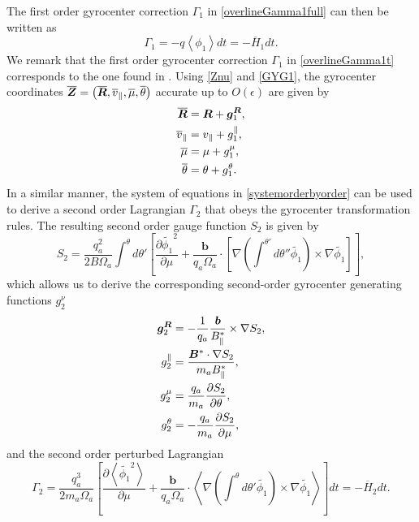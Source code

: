 %
The first order gyrocenter correction ${\Gamma}_1$ in \cref{overlineGamma1full} can then be written as
%
\begin{equation} \label{overlineGamma1t}
{\Gamma}_{1} = - q \left< \phi_1 \right> d t = - \overline H_1 dt.
\end{equation}
%
We remark that the first order gyrocenter correction ${\Gamma}_1$ in \cref{overlineGamma1t} corresponds to the one found in \citet{Brizard2007a,Hahm2009}.
%
Using \cref{Znu} and \cref{GYG1}, the gyrocenter coordinates $\overline{\bm{Z}} = \left( \overline{\bm{R}}, \overline{v}_{\parallel}, \overline{\mu}, \overline{\theta} \right)$ accurate up to $O(\epsilon)$ are given by
%
\begin{equation} \label{GYcoordinates}
\begin{aligned}
\overline{\bm{R} } &= \bm{R}  +\bm{g}^{\bm{R}}_1,\\
 \overline{v}_{\parallel} &= v_{\parallel} + g^{\parallel}_1,  \\
 \overline{\mu}&=\mu+g^{\mu}_1 ,\\
   \overline{\theta} &= \theta  +g^{\theta}_1 .
\end{aligned}
\end{equation}
%
In a similar manner, the system of equations in \cref{systemorderbyorder} can be used to derive a second order Lagrangian $\Gamma_2$ that obeys the gyrocenter transformation rules.
%
%
The resulting second order gauge function $S_2$ is given by
%
\begin{equation}
    S_2 =\frac{q_a^2}{2 B\Omega_a} \int^\theta d \theta' \left[\frac{\partial \widetilde{\phi_1}^2}{\partial \mu}+\frac{\bm b}{q_a \Omega_a}\cdot\left[\nabla \left(\int^{\theta'} d \theta'' \widetilde{\phi_1}\right) \times \nabla \widetilde{\phi_1}\right]\right],
\end{equation}
%
which allows us to derive the corresponding second-order gyrocenter generating functions ${g}_2^\nu$
%
\begin{align}
\bm{g}^{\bm{R}}_2& = -\frac{1}{q_a} \frac{\bm{b}}{B^*_{\parallel}} \times  \nabla  S_2, \label{GYG2R}\\
g^{\parallel}_2& = \frac{ \bm{B}^* \cdot \nabla S_2}{m_a B^*_{\parallel}}, \label{GYG2parallel}\\
g^{\mu}_2& = \frac{q_a}{m_a  } \frac{\partial S_2}{\partial \theta} ,  \\
g^{\theta}_2& =  - \frac{q_a}{m_a  } \frac{\partial S_2}{\partial \mu} , \label{GYG2theta}
\end{align}
%
and the second order perturbed Lagrangian
%
\begin{equation} \label{overlineGamma2}
{\Gamma}_2 =   \frac{q_a^3}{2  m_a \Omega_a }\left[\frac{\partial \left< \widetilde{\phi_1}^2\right>}{\partial \mu}+\frac{\bm b}{q_a \Omega_a}\cdot\left<\nabla \left(\int^\theta d \theta'\widetilde{\phi_1}\right)\times \nabla \widetilde{\phi_1}\right>\right] d t=-\overline H_2 dt.
\end{equation}

